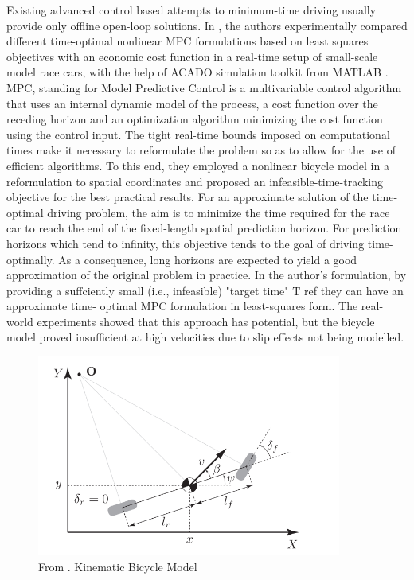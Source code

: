 Existing advanced control based attempts to minimum-time driving usually provide only offline open-loop solutions.
In \cite{mpc}, the authors experimentally compared different time-optimal nonlinear MPC \cite{mpc_orig} formulations based on least squares objectives with an economic cost function in a real-time setup of small-scale model race cars, with the help of ACADO simulation toolkit from MATLAB \cite{acado}.
MPC, standing for Model Predictive Control is a multivariable control algorithm that uses an internal dynamic model of the process, a cost function over the receding horizon and an optimization algorithm minimizing the cost function using the control input.
The tight real-time bounds imposed on computational times make it necessary to reformulate the problem so as to allow for the use of efficient algorithms. To this end, they employed a nonlinear bicycle model \cite{bycicle} in a reformulation to spatial coordinates and proposed an infeasible-time-tracking objective for the best practical results.
For an approximate solution of the time-optimal driving problem, the aim is to minimize the time required for the race car to reach the end of the fixed-length spatial prediction horizon. For prediction horizons which tend to infinity, this objective tends to the goal of driving time-optimally. As a consequence, long horizons are expected to yield a good approximation of the original problem in practice.
In the author's formulation, by providing a suffciently small (i.e., infeasible) "target time" T ref they can have an approximate time-
optimal MPC formulation in least-squares form. 
The real-world experiments showed that this approach has potential, but the bicycle model proved insufficient at high velocities due to slip effects not being modelled.
\begin{figure}
 \centering
  \captionsetup{width=10cm}
  \includegraphics[width=10cm]{./img/bycicle}
  \caption{From \cite{mpc}. Kinematic Bicycle Model}
\end{figure}
